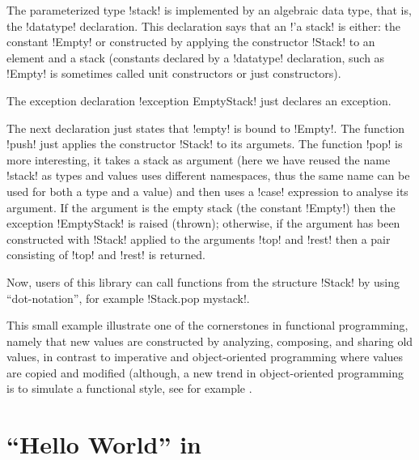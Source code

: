 \documentclass[workingdraft]{usetex-v1}
\begin{document}
The parameterized type !stack! is implemented by an algebraic data
type, that is, the !datatype! declaration.  This declaration says that
an !'a stack! is either: the constant !Empty! or constructed by
applying the constructor !Stack! to an element and a stack (constants
declared by a !datatype! declaration, such as !Empty!  is sometimes
called unit constructors or just constructors).

The exception declaration !exception EmptyStack! just declares an
exception.

The next declaration just states that !empty! is bound to !Empty!.  The
function !push! just applies the constructor !Stack! to its argumets.
The function !pop! is more interesting, it takes a stack as argument
(here we have reused the name !stack! as types and values uses
different namespaces, thus the same name can be used for both a type
and a value) and then uses a !case! expression to analyse its argument.
If the argument is the empty stack (the constant !Empty!) then the
exception !EmptyStack! is raised (thrown); otherwise, if the argument
has been constructed with !Stack! applied to the arguments !top! and
!rest! then a pair consisting of !top! and !rest! is returned.

Now, users of this library can call functions from the structure
!Stack! by using ``dot-notation'', for example !Stack.pop mystack!.

This small example illustrate one of the cornerstones in functional
programming, namely that new values are constructed by analyzing,
composing, and sharing old values, in contrast to imperative and
object-oriented programming where values are copied and modified
(although, a new trend in object-oriented programming is to simulate a
functional style, see for example \cite[Item 13 and
14]{bloch01:effective-java}.










\section{``Hello World'' in \mgtk}
\label{sec:example}
\end{document}

